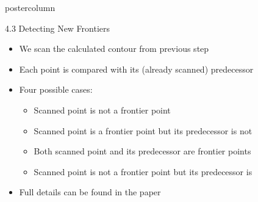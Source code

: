 \begin{beamercolorbox}[center,wd=\textwidth]{postercolumn}
        \begin{minipage}[T]{.95\textwidth} %
          \parbox[t][\columnheight]{\textwidth}{ %
            
            \begin{block}{4.3 Detecting New Frontiers}
              \begin{itemize}
                \item We scan the calculated contour from previous step
                \item Each point is compared with its (already scanned)
                predecessor
                \item Four possible cases:
                	\begin{itemize}
                	  \item Scanned point is not a frontier point
                	  \item Scanned point is a frontier point but its predecessor is
                	  not
                	  \item Both scanned point and its predecessor are frontier points
                	  \item Scanned point is not a frontier point but its predecessor
                	  is
                	\end{itemize}
                \item Full details can be found in the paper
              \end{itemize}
            \end{block}
            \vfill
            
}
\end{minipage}
\end{beamercolorbox}
